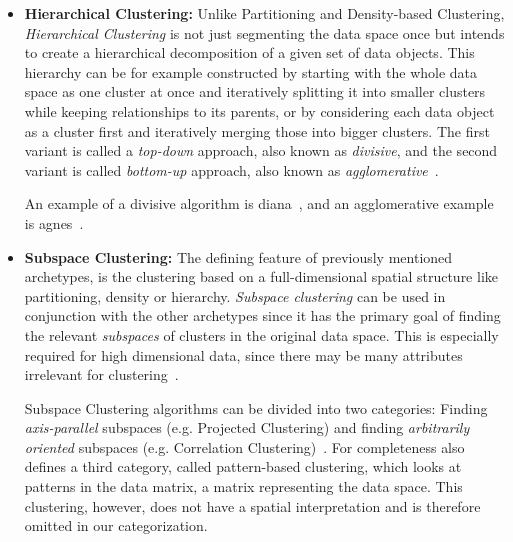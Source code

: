 \begin{itemize}
    \item \textbf{Hierarchical Clustering:} Unlike Partitioning and Density-based Clustering, \textit{Hierarchical Clustering} is not just segmenting the data space once but intends to create a hierarchical decomposition of a given set of data objects. This hierarchy can be for example constructed by starting with the whole data space as one cluster at once and iteratively splitting it into smaller clusters while keeping relationships to its parents, or by considering each data object as a cluster first and iteratively merging those into bigger clusters. The first variant is called a \textit{top-down} approach, also known as \textit{divisive}, and the second variant is called \textit{bottom-up} approach, also known as \textit{agglomerative}~\cite[Ch.10.3]{han2011data}. 
    
    An example of a divisive algorithm is \acrshort{diana}~\cite[Ch.6]{kaufman2009finding}, and an agglomerative example is \acrshort{agnes}~\cite[Ch.5]{kaufman2009finding}.
    
    
    \item \textbf{Subspace Clustering:} The defining feature of previously mentioned archetypes, is the clustering based on a full-dimensional spatial structure like partitioning, density or hierarchy. \textit{Subspace clustering} can be used in conjunction with the other archetypes since it has the primary goal of finding the relevant \textit{subspaces} of clusters in the original data space. This is especially required for high dimensional data, since there may be many attributes irrelevant for clustering~\cite{vidal2011subspace}. 
    
    Subspace Clustering algorithms can be divided into two categories: Finding \textit{axis-parallel} subspaces (e.g. Projected Clustering) and finding \textit{arbitrarily oriented} subspaces (e.g. Correlation Clustering)~\cite[Ch.3]{zimek2009correlation}.
    For completeness \textcite{zimek2009correlation} also defines a third category, called pattern-based clustering, which looks at patterns in the data matrix, a matrix representing the data space. This clustering, however, does not have a spatial interpretation and is therefore omitted in our categorization.
    

\end{itemize}
